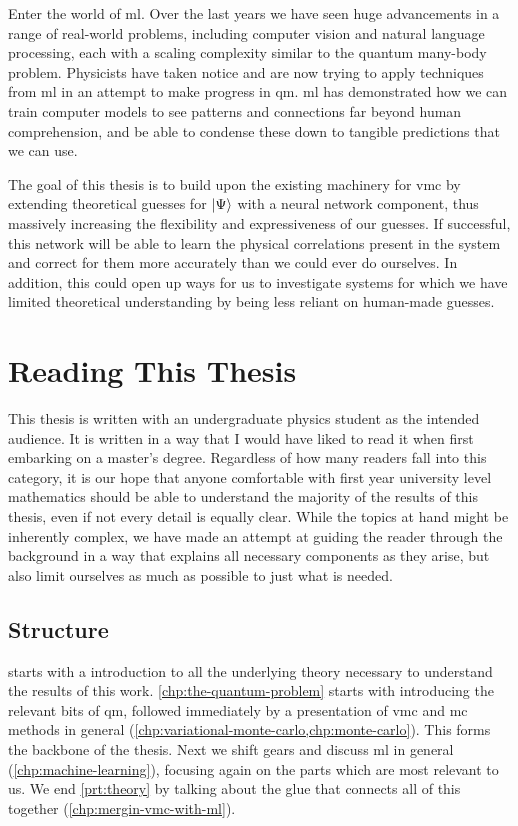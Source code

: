 \documentclass[Thesis.tex]{subfiles}
\begin{document}
Enter the world of \gls{ml}. Over the last years we have seen
huge advancements in a range of real-world problems, including computer vision and
natural language processing, each with a scaling complexity similar to
the quantum many-body problem.
Physicists have taken notice and are now trying
to apply techniques from \gls{ml} in an attempt to make progress in \gls{qm}. \Acrlong{ml} has
demonstrated how we can train computer models to see patterns and connections
far beyond human comprehension, and be able to condense these down to tangible
predictions that we can use.

The goal of this thesis is to build upon the existing machinery for \gls{vmc} by extending
theoretical guesses for $| \Psi \rangle$ with a neural network component, thus massively
increasing the flexibility and expressiveness of our guesses. If successful, this
network will be able to learn the physical correlations present in the system
and correct for them more accurately than we could ever do ourselves. In
addition, this could open up ways for us to investigate systems for which we
have limited theoretical understanding by being less reliant on human-made guesses.


\section*{Reading This Thesis}

This thesis is written with an undergraduate physics student as the intended %
audience. It is written in a way that I would have liked to read it when first
embarking on a master's degree. Regardless of how many readers fall into this
category, it is our hope that anyone comfortable with first year university
level mathematics should be able to understand the majority of the results of this
thesis, even if not every detail is equally clear. While the topics at hand might be
inherently complex, we have made an attempt at guiding the reader through the
background in a way that explains all necessary components as they arise, but
also limit ourselves as much as possible to just what is needed.


\subsection*{Structure}
 starts with a introduction to all the underlying theory
necessary to understand the results of this work. \cref{chp:the-quantum-problem}
starts with introducing the relevant bits of \acrlong{qm}, followed
immediately by a presentation of \acrlong{vmc} and \acrlong{mc} methods
in general (\cref{chp:variational-monte-carlo,chp:monte-carlo}). This forms the
backbone of the thesis. Next we shift gears and discuss \acrlong{ml} in
general (\cref{chp:machine-learning}), focusing again on the parts which are
most relevant to us. We end \cref{prt:theory} by talking about the glue that
connects all of this together (\cref{chp:mergin-vmc-with-ml}).
\end{document}
